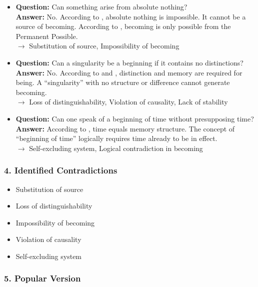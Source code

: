 \documentclass[12pt]{article}
\begin{document}
\begin{itemize}
\item \textbf{Question:} Can something arise from absolute nothing?\\
\textbf{Answer:} No. According to \text{[1]}, absolute nothing is impossible. It cannot be a source of becoming. According to \text{[6]}, becoming is only possible from the Permanent Possible.\\
$\rightarrow$ Substitution of source, Impossibility of becoming

\item \textbf{Question:} Can a singularity be a beginning if it contains no distinctions?\\
\textbf{Answer:} No. According to \text{[9.1]} and \text{[10.3]}, distinction and memory are required for being. A ``singularity'' with no structure or difference cannot generate becoming.\\
$\rightarrow$ Loss of distinguishability, Violation of causality, Lack of stability

\item \textbf{Question:} Can one speak of a beginning of time without presupposing time?\\
\textbf{Answer:} According to \text{[10.3.7]}, time equals memory structure. The concept of ``beginning of time'' logically requires time already to be in effect.\\
$\rightarrow$ Self-excluding system, Logical contradiction in becoming
\end{itemize}

\subsubsection*{4. Identified Contradictions}

\begin{itemize}
\item Substitution of source
\item Loss of distinguishability
\item Impossibility of becoming
\item Violation of causality
\item Self-excluding system
\end{itemize}

\subsubsection*{5. Popular Version}
\end{document}

